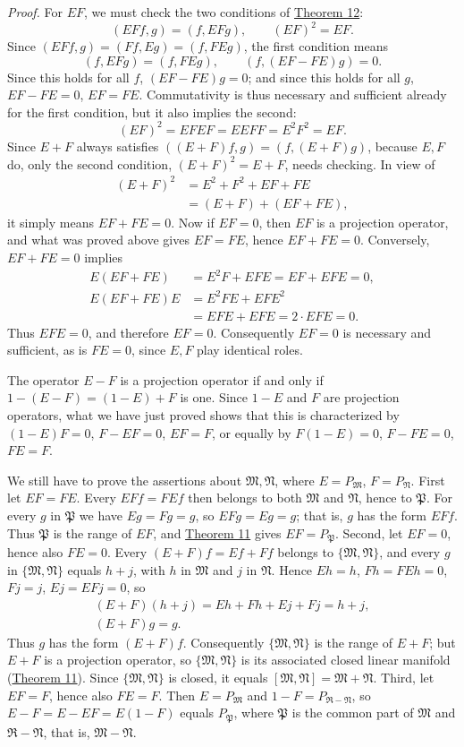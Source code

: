 \documentclass[fontsize=13pt,twoside,openany,headings=normal,parskip=false,bookmarkpackage=false,DIV=calc]{scrbook}
\begin{document}
\emph{Proof.} For $EF$, we must check the two conditions of \hyperref[thm:II.12]{Theorem 12}:
\[
(EFf,g)=(f,EFg),\qquad(EF)^2=EF.
\]
Since $(EFf,g)=(Ff,Eg)=(f,FEg)$, the first condition means
\[
(f,EFg)=(f,FEg),\qquad(f,(EF-FE)g)=0.
\]
Since this holds for all $f$, $(EF-FE)g=0$; and since this holds for all $g$, $EF-FE=0$, $EF=FE$. Commutativity is thus necessary and sufficient already for the first condition, but it also implies the second:
\[
(EF)^2=EFEF=EEFF=E^2F^2=EF.
\]
Since $E+F$ always satisfies $((E+F)f,g)=(f,(E+F)g)$, because $E,F$ do, only the second condition, $(E+F)^2=E+F$, needs checking. In view of
\begin{align*}
(E+F)^2&=E^2+F^2+EF+FE\\
&=(E+F)+(EF+FE),
\end{align*}
it simply means $EF+FE=0$. Now if $EF=0$, then $EF$ is a projection operator, and what was proved above gives $EF=FE$, hence $EF+FE=0$. Conversely, $EF+FE=0$ implies
\begin{align*}
E(EF+FE)&=E^2F+EFE=EF+EFE=0,\\
E(EF+FE)E&=E^2FE+EFE^2\\
&=EFE+EFE=2\cdot EFE=0.
\end{align*}
Thus $EFE=0$, and therefore $EF=0$. Consequently $EF=0$ is necessary and sufficient, as is $FE=0$, since $E,F$ play identical roles.

The operator $E-F$ is a projection operator if and only if $1-(E-F)=(1-E)+F$ is one. Since $1-E$ and $F$ are projection operators, what we have just proved shows that this is characterized by $(1-E)F=0$, $F-EF=0$, $EF=F$, or equally by $F(1-E)=0$, $F-FE=0$, $FE=F$.

\hypertarget{origpage-44}{}%
We still have to prove the assertions about $\mathfrak{M},\mathfrak{N}$, where $E=P_{\mathfrak{M}}$, $F=P_{\mathfrak{N}}$. First let $EF=FE$. Every $EFf=FEf$ then belongs to both $\mathfrak{M}$ and $\mathfrak{N}$, hence to $\mathfrak{P}$. For every $g$ in $\mathfrak{P}$ we have $Eg=Fg=g$, so $EFg=Eg=g$; that is, $g$ has the form $EFf$. Thus $\mathfrak{P}$ is the range of $EF$, and \hyperref[thm:II.11]{Theorem 11} gives $EF=P_{\mathfrak{P}}$. Second, let $EF=0$, hence also $FE=0$. Every $(E+F)f=Ef+Ff$ belongs to $\{\mathfrak{M},\mathfrak{N}\}$, and every $g$ in $\{\mathfrak{M},\mathfrak{N}\}$ equals $h+j$, with $h$ in $\mathfrak{M}$ and $j$ in $\mathfrak{N}$. Hence $Eh=h$, $Fh=FEh=0$, $Fj=j$, $Ej=EFj=0$, so
\begin{gather*}
(E+F)(h+j)=Eh+Fh+Ej+Fj=h+j,\\
(E+F)g=g.
\end{gather*}
Thus $g$ has the form $(E+F)f$. Consequently $\{\mathfrak{M},\mathfrak{N}\}$ is the range of $E+F$; but $E+F$ is a projection operator, so $\{\mathfrak{M},\mathfrak{N}\}$ is its associated closed linear manifold (\hyperref[thm:II.11]{Theorem 11}). Since $\{\mathfrak{M},\mathfrak{N}\}$ is closed, it equals $[\mathfrak{M},\mathfrak{N}]=\mathfrak{M}+\mathfrak{N}$. Third, let $EF=F$, hence also $FE=F$. Then $E=P_{\mathfrak{M}}$ and $1-F=P_{\mathfrak{R}-\mathfrak{N}}$, so $E-F=E-EF=E(1-F)$ equals $P_{\mathfrak{P}}$, where $\mathfrak{P}$ is the common part of $\mathfrak{M}$ and $\mathfrak{R}-\mathfrak{N}$, that is, $\mathfrak{M}-\mathfrak{N}$.
\end{document}
